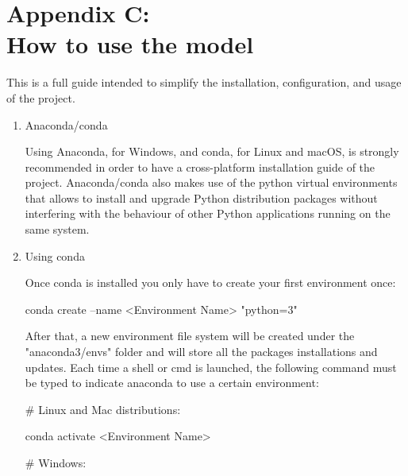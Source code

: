 \vspace{\baselineskip}\chapter*{Appendix C: \\ How to use the model}
This is a full guide intended to simplify the installation, configuration, and usage of the project. \par

\begin{enumerate}
	\item Anaconda/conda\par

Using Anaconda, for Windows, and conda, for Linux and macOS, is strongly recommended in order to have a cross-platform installation guide of the project. Anaconda/conda also makes use of the python virtual environments that allows to install and upgrade Python distribution packages without interfering with the behaviour of other Python applications running on the same system.\par

	\item Using conda\par

Once conda is installed you only have to create your first environment once:\par

{\fontsize{9pt}{10.8pt}\selectfont conda create --name <Environment Name> "python=3"\par}\par

After that, a new environment file system will be created under the "anaconda3/envs" folder and will store all the packages installations and updates. Each time a shell or cmd is launched, the following command must be typed to indicate anaconda to use a certain environment:\par

{\fontsize{9pt}{10.8pt}\selectfont $\#$  Linux and Mac distributions:\par}\par

{\fontsize{9pt}{10.8pt}\selectfont conda activate <Environment Name>\par}\par


\vspace{\baselineskip}
{\fontsize{9pt}{10.8pt}\selectfont $\#$  Windows:\par}\par


\end{enumerate}
